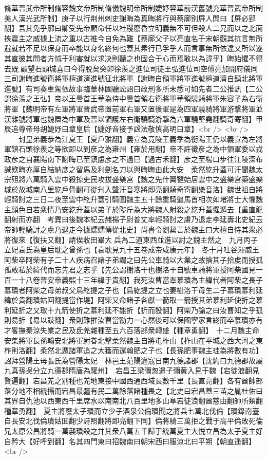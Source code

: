 脩華晉武帝所制脩容魏文帝所制脩儀魏明帝所制婕妤容華前漢舊號充華晉武帝所制美人漢光武所制】庚子以行荆州刺史謝晦為真晦將行與蔡廓别屛人問曰【屏必郢翻】吾其免乎廓曰卿受先帝顧命任以社稷廢昏立明義無不可但殺人二兄而以之北面挾震主之威據上流之重以古推今自免為難【蔡廓父子以亮直名于宋朝觀其抗言無所避就若不足以保身而卒能以身名終何也蓋其素行已孚乎人而言事無所依違又所以遂其直彼其問者方怵于利害就以求决則聽之也固合于心而焉敢以為諱乎】晦始懼不得去既顧望石頭城喜曰今得脱矣癸卯徐羨之進位司徒王弘進位司空傅亮加開府儀同三司謝晦進號衛將軍檀道濟進號征北將軍【謝晦自領軍將軍進號檀道濟自鎮北將軍進號】有司奏車駕依故事臨華林園聽訟詔曰政刑多所未悉可如先者二公推訊【二公謂徐羨之王弘】帝以王曇首王華為侍中曇首領右衛將軍華領驍騎將軍朱容子為右衛將軍【魏明帝有左軍將軍晉武帝置前軍右軍又置後軍是為四軍驍騎將軍游撃將軍並漢雜號將軍也魏置為中軍及晉以領護左右衛驍騎游撃為六軍驍堅堯翻騎奇寄翻】甲辰追尊帝母胡婕妤曰章皇后【婕妤音接予諡法敬慎高明曰章】<br />
<br />
　　封皇弟義恭為江夏王【夏戶雅翻】義宣為竟陵王義季為衡陽王仍以義宣為左將軍鎮石頭徐羨之等欲即以到彦之為雍州【雍於用翻】帝不許徵彦之為中領軍委以戎政彦之自襄陽南下謝晦已至鎮慮彦之不過已【過古禾翻】彦之至楊口步往江陵深布誠欵晦亦厚自結納彦之留馬及利劍名刀以與晦晦由此大安　柔然紇升蓋可汗聞魏太宗殂將六萬騎入雲中殺掠吏民攻拔盛樂宫【魏之先什翼犍始居雲中之盛樂宫築盛樂城於故城南八里紇戶骨翻可從刋入聲汗音寒將即亮翻騎奇寄翻樂音洛】魏世祖自將輕騎討之三日二夜至雲中紇升蓋引騎圍魏主五十餘重騎逼馬首相次如堵將士大懼魏主顔色自若衆情乃安紇升蓋以弟子於陟斤為大將魏人射殺之紇升蓋懼遁去【重直龍翻射而亦翻　考異曰後魏本紀云赭楊子尉普丈率輕騎討之虜乃退走李延夀北史紀云帝帥輕騎討之虜乃退走今據蠕蠕傳從北史】尚書令劉絜言於魏主曰大檀自恃其衆必將復來【復扶又翻】請俟收田畢大兵為二道東西並進以討之魏主然之　九月丙子立妃袁氏為皇后耽之曾孫也【袁耽見九十五卷成帝咸康元年】　冬十月吐谷渾威王阿柴卒阿柴有子二十人疾病召諸子弟謂之曰先公車騎以大業之故捨其子拾䖍而授孤孤敢私於緯代而忘先君之志乎【先公謂樹洛干也樹洛干自號車騎將軍授阿柴國見一百一十八卷晉安帝義熙十三年緯于貴翻】我死汝曹當奉慕璝為主緯代者阿柴之長子慕璝者阿柴之母弟叔父烏紇提之子也【烏紇提之立也妻樹洛干母生二子慕璝慕利延緯於貴翻璝姑回翻提當作堤】阿柴又命諸子各獻一箭取一箭授其弟慕利延使折之慕利延折之又取十九箭使折之慕利延不能折【折而設翻】阿柴乃諭之曰汝曹知之乎孤則易折【易以豉翻】衆則難摧汝曹當勠力一心然後可以保國寧家言終而卒慕璝亦有才畧撫秦涼失業之民及氐羌雜種至五六百落部衆轉盛【種章勇翻】　十二月魏主命安集將軍長孫翰安北將軍尉眷北撃柔然魏主自將屯柞山【柞山在平城之西大河之東柞則洛翻】柔然北遁諸軍追之大獲而還翰肥之子也【長孫肥事魏主珪為將數有功】　詔拜營陽王母張氏為營陽太妃　林邑王范陽邁寇日南九德諸郡【沈約曰九德郡故屬九真孫吳分立九德郡隋唐為驩州】　宕昌王梁彌怱遣子彌黄入見于魏【宕徒浪翻見賢遍翻】宕昌羌之别種也羌地東接中國西通西域長數千里【長直亮翻】各有酋帥部落分地不相統攝而宕昌最疆有民二萬餘落諸種畏之【北史曰宕昌蓋三苖之胤杜佑曰其界自仇池以西東西千里席水以南南北八百里地多山阜宕徒浪翻酋慈由翻帥所類翻種章勇翻】　夏主將廢太子璝而立少子酒泉公倫璝聞之將兵七萬北伐倫【璝錄南臺自長安北伐倫璝姑囬翻少詩照翻將即亮翻下同】倫將騎三萬拒之戰于高平倫敗死倫兄太原公昌將騎一萬襲璝殺之并其衆八萬五千歸于統萬夏主大悦立昌為太子夏主好自矜大【好呼到翻】名其四門東曰招魏南曰朝宋西曰服涼北曰平朔【朝直遥翻】<br />
